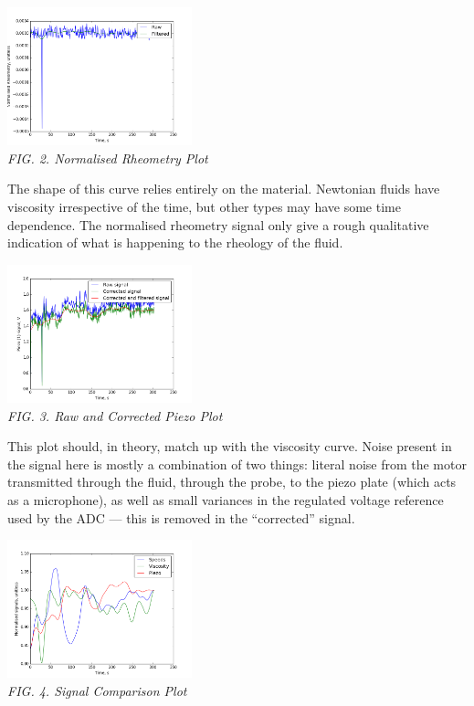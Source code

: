 \documentclass{article}
\begin{document}
	{\centering \includegraphics[width=0.4\textwidth]{viscometry.png}\\
	\textit{FIG. 2. Normalised Rheometry Plot}\\}

	The shape of this curve relies entirely on the material. Newtonian fluids have viscosity irrespective of the time, but other types may have some time dependence. The normalised rheometry signal only give a rough qualitative indication of what is happening to the rheology of the fluid.
	
	{\centering \includegraphics[width=0.4\textwidth]{general_piezo.png}\\
	\textit{FIG. 3. Raw and Corrected Piezo Plot}\\}

	This plot should, in theory, match up with the viscosity curve. Noise present in the signal here is mostly a combination of two things: literal noise from the motor transmitted through the fluid, through the probe, to the piezo plate (which acts as a microphone), as well as small variances in the regulated voltage reference used by the ADC --- this is removed in the ``corrected'' signal.
		
	{\centering \includegraphics[width=0.4\textwidth]{signal_compare.png}\\
	\textit{FIG. 4. Signal Comparison Plot}\\}

	
\end{document}
